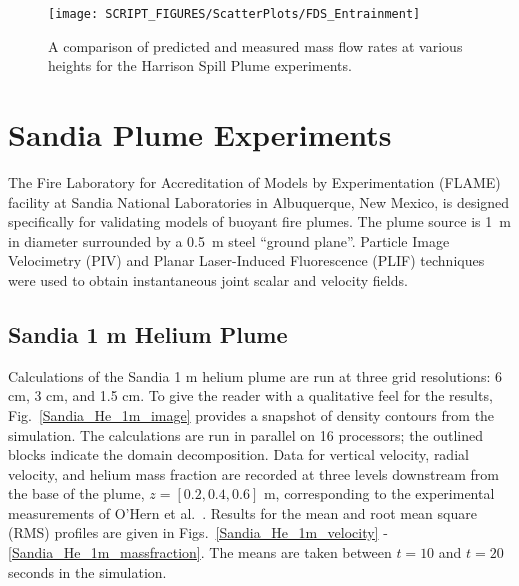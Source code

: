\begin{figure}[h]
\begin{center}
\texttt{[image: SCRIPT\_FIGURES/ScatterPlots/FDS\_Entrainment]}
\caption[Summary of plume entrainment predictions]{A comparison of predicted and measured mass flow rates at various heights for the Harrison Spill Plume experiments.}
\label{Entrainment_Plot}
\end{center}
\end{figure}




\clearpage

\section{Sandia Plume Experiments}

The Fire Laboratory for Accreditation of Models by Experimentation (FLAME) facility \cite{OHern:2005,Blanchat:2001} at Sandia National Laboratories in Albuquerque, New Mexico, is designed specifically for validating models of buoyant fire plumes.  The plume source is 1~m in diameter surrounded by a 0.5~m steel ``ground plane''. Particle Image Velocimetry (PIV) and Planar Laser-Induced Fluorescence (PLIF) techniques were used to obtain instantaneous joint scalar and velocity fields.

\subsection{Sandia 1 m Helium Plume}
\label{Sandia plume}

Calculations of the Sandia 1 m helium plume are run at three grid resolutions: 6 cm, 3 cm, and 1.5 cm.  To give the reader with a qualitative feel for the results, Fig.~\ref{Sandia_He_1m_image} provides a snapshot of density contours from the simulation. The calculations are run in parallel on 16 processors; the outlined blocks indicate the domain decomposition.  Data for vertical velocity, radial velocity, and helium mass fraction are recorded at three levels downstream from the base of the plume, $z = [0.2, 0.4, 0.6]$ m, corresponding to the experimental measurements of O'Hern et al.~\cite{OHern:2005}.  Results for the mean and root mean square (RMS) profiles are given in Figs.~\ref{Sandia_He_1m_velocity} - \ref{Sandia_He_1m_massfraction}.  The means are taken between $t=10$ and $t=20$ seconds in the simulation.


